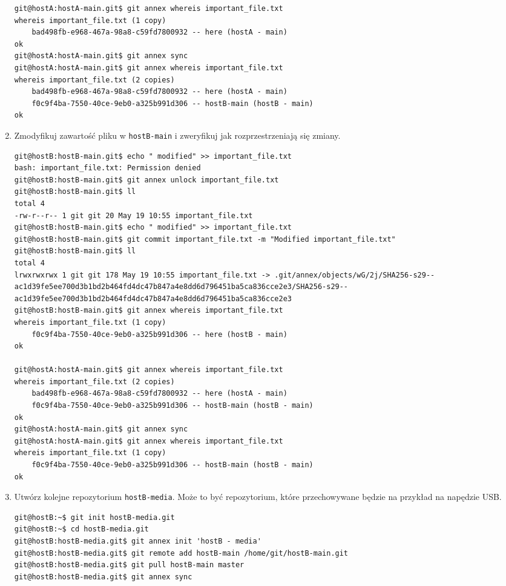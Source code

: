 \documentclass[polish]{article}
\begin{document}
\begin{enumerate}
\begin{lstlisting}
git@hostA:hostA-main.git$ git annex whereis important_file.txt
whereis important_file.txt (1 copy)
    bad498fb-e968-467a-98a8-c59fd7800932 -- here (hostA - main)
ok
git@hostA:hostA-main.git$ git annex sync
git@hostA:hostA-main.git$ git annex whereis important_file.txt
whereis important_file.txt (2 copies)
    bad498fb-e968-467a-98a8-c59fd7800932 -- here (hostA - main)
    f0c9f4ba-7550-40ce-9eb0-a325b991d306 -- hostB-main (hostB - main)
ok
   \end{lstlisting}

\item Zmodyfikuj zawartość pliku w \texttt{hostB-main} i zweryfikuj jak rozprzestrzeniają
   się zmiany.

   \begin{lstlisting}
git@hostB:hostB-main.git$ echo " modified" >> important_file.txt
bash: important_file.txt: Permission denied
git@hostB:hostB-main.git$ git annex unlock important_file.txt
git@hostB:hostB-main.git$ ll
total 4
-rw-r--r-- 1 git git 20 May 19 10:55 important_file.txt
git@hostB:hostB-main.git$ echo " modified" >> important_file.txt
git@hostB:hostB-main.git$ git commit important_file.txt -m "Modified important_file.txt"
git@hostB:hostB-main.git$ ll
total 4
lrwxrwxrwx 1 git git 178 May 19 10:55 important_file.txt -> .git/annex/objects/wG/2j/SHA256-s29--ac1d39fe5ee700d3b1bd2b464fd4dc47b847a4e8dd6d796451ba5ca836cce2e3/SHA256-s29--ac1d39fe5ee700d3b1bd2b464fd4dc47b847a4e8dd6d796451ba5ca836cce2e3
git@hostB:hostB-main.git$ git annex whereis important_file.txt
whereis important_file.txt (1 copy)
    f0c9f4ba-7550-40ce-9eb0-a325b991d306 -- here (hostB - main)
ok

git@hostA:hostA-main.git$ git annex whereis important_file.txt
whereis important_file.txt (2 copies)
    bad498fb-e968-467a-98a8-c59fd7800932 -- here (hostA - main)
    f0c9f4ba-7550-40ce-9eb0-a325b991d306 -- hostB-main (hostB - main)
ok
git@hostA:hostA-main.git$ git annex sync
git@hostA:hostA-main.git$ git annex whereis important_file.txt
whereis important_file.txt (1 copy)
    f0c9f4ba-7550-40ce-9eb0-a325b991d306 -- hostB-main (hostB - main)
ok
   \end{lstlisting}

\item Utwórz kolejne repozytorium \texttt{hostB-media}.
   Może to być repozytorium, które przechowywane będzie na przykład na napędzie USB.

   \begin{lstlisting}
git@hostB:~$ git init hostB-media.git
git@hostB:~$ cd hostB-media.git
git@hostB:hostB-media.git$ git annex init 'hostB - media'
git@hostB:hostB-media.git$ git remote add hostB-main /home/git/hostB-main.git
git@hostB:hostB-media.git$ git pull hostB-main master
git@hostB:hostB-media.git$ git annex sync


\end{lstlisting}
\end{enumerate}
\end{document}
